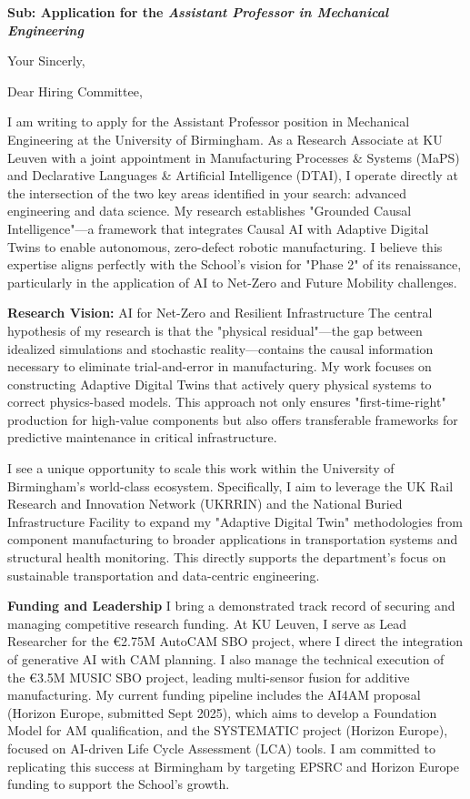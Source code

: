\documentclass[10pt,a4paper,roman]{moderncv}
\newcommand{\jobTitle}{\textbf{\textit{Assistant Professor in Mechanical Engineering
}}}
\newcommand{\jobInstitution}{\textit{University of Birmingham}}
\begin{document}
\recipient{To}{\jobInstitution
    }

\date{\today}
\opening{\textbf{Sub: Application for the \jobTitle}}
\closing{Your Sincerly, \vspace{-1em}}

\makelettertitle
Dear Hiring Committee,

I am writing to apply for the Assistant Professor position in Mechanical Engineering at the University of Birmingham. As a Research Associate at KU Leuven with a joint appointment in Manufacturing Processes & Systems (MaPS) and Declarative Languages & Artificial Intelligence (DTAI), I operate directly at the intersection of the two key areas identified in your search: advanced engineering and data science. My research establishes "Grounded Causal Intelligence"—a framework that integrates Causal AI with Adaptive Digital Twins to enable autonomous, zero-defect robotic manufacturing. I believe this expertise aligns perfectly with the School’s vision for "Phase 2" of its renaissance, particularly in the application of AI to Net-Zero and Future Mobility challenges.

\textbf{Research Vision:} AI for Net-Zero and Resilient Infrastructure The central hypothesis of my research is that the "physical residual"—the gap between idealized simulations and stochastic reality—contains the causal information necessary to eliminate trial-and-error in manufacturing. My work focuses on constructing Adaptive Digital Twins that actively query physical systems to correct physics-based models. This approach not only ensures "first-time-right" production for high-value components but also offers transferable frameworks for predictive maintenance in critical infrastructure.

I see a unique opportunity to scale this work within the University of Birmingham’s world-class ecosystem. Specifically, I aim to leverage the UK Rail Research and Innovation Network (UKRRIN) and the National Buried Infrastructure Facility to expand my "Adaptive Digital Twin" methodologies from component manufacturing to broader applications in transportation systems and structural health monitoring. This directly supports the department’s focus on sustainable transportation and data-centric engineering.

\textbf{Funding and Leadership} I bring a demonstrated track record of securing and managing competitive research funding. At KU Leuven, I serve as Lead Researcher for the €2.75M AutoCAM SBO project, where I direct the integration of generative AI with CAM planning. I also manage the technical execution of the €3.5M MUSIC SBO project, leading multi-sensor fusion for additive manufacturing. My current funding pipeline includes the AI4AM proposal (Horizon Europe, submitted Sept 2025), which aims to develop a Foundation Model for AM qualification, and the SYSTEMATIC project (Horizon Europe), focused on AI-driven Life Cycle Assessment (LCA) tools. I am committed to replicating this success at Birmingham by targeting EPSRC and Horizon Europe funding to support the School’s growth.
\end{document}
